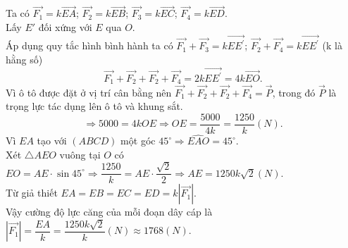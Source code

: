 \begin{bt}
{		Ta có  $\overrightarrow{F_1}=k\overrightarrow{EA}$; $\overrightarrow{F_2}=k\overrightarrow{EB}$; $\overrightarrow{F_3}=k\overrightarrow{EC}$; $\overrightarrow{F_4}=k\overrightarrow{ED}$.\\
		Lấy $E'$ đối xứng với  $E$ qua $O$.\\
		Áp dụng quy tắc hình bình hành ta có  $\overrightarrow{F_1}+\overrightarrow{F_3}=k\overrightarrow{EE^{'}}$; $\overrightarrow{F_2}+\overrightarrow{F_4}=k\overrightarrow{EE^{'}}$ (k là hằng số)
		\[\overrightarrow{F_1}+\overrightarrow{F_2}+\overrightarrow{F_2}+\overrightarrow{F_4}=2k\overrightarrow{EE^{'}}=4k\overrightarrow{EO}. 
		\] 
		Vì ô tô được đặt ở vị trí cân bằng nên $\overrightarrow{F_1}+\overrightarrow{F_2}+\overrightarrow{F_2}+\overrightarrow{F_4}=\overrightarrow{P}$,  trong đó $\overrightarrow{P}$ là trọng lực tác dụng lên ô tô và khung sắt.
		\[\Rightarrow  5000=4kOE\Rightarrow OE=\dfrac{5000}{4k}=\dfrac{1250}{k} (N).
		\] 
		Vì $EA$ tạo với $\left(ABCD\right)$ một góc $45^\circ\Rightarrow  \widehat{EAO}=45^\circ$.\\
		 Xét $\triangle AEO$ vuông tại $O$ có $EO=AE\cdot\sin 45^\circ\Rightarrow \dfrac{1250}{k}=AE\cdot\dfrac{\sqrt{2}}{2} \Rightarrow AE=1250k\sqrt{2} (N)$.\\
		 Từ giả thiết $EA=EB=EC=ED=k\left|\overrightarrow{F_1}\right|$.\\
		Vậy cường độ lực căng của mỗi đoạn dây cáp là$\left|\overrightarrow{F_1}\right|=\dfrac{EA}{k}=\dfrac{1250k\sqrt{2}}{k} (N)\approx  1768(N)$.
	 }
\end{bt}

